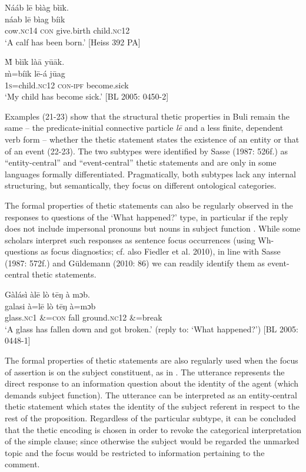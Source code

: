 \documentclass[output=paper]{langsci/langscibook}
\begin{document}
\ea\label{ex:schwarz:22}
\glll  Nááb    l\={e}  bìàg    bì\={i}k.\\
    \textup{náab}    l\={e}  bìag    {bíik}\\
       cow.\textsc{nc}14  \textsc{con}   give.birth  child.\textsc{nc}12\\
\glt ‘A calf has been born.’ [Heiss 392 PA]
\z

\ea\label{ex:schwarz:23}
\glll   \`{M}  bì\={i}k      là\={a}    y\={u}\={a}k.\\
    \textup{\`{m}=bíik      l\={e}-á    j\={u}ag}\\
       1\textsc{s}=child.\textsc{nc}12    \textsc{con}-\textsc{ipf}  become.sick\\
\glt ‘My child has become sick.’ [BL  2005: 0450-2]
\z

Examples (21-23) show that the structural thetic properties in Buli remain the same – the predicate-initial connective particle \textit{l\={e}} and a less finite, dependent verb form – whether the thetic statement states the existence of an entity  or that of an event (22-23). The two subtypes were identified by Sasse (1987: 526f.) as “entity-central” and “event-central” thetic statements and are only in some languages formally differentiated. Pragmatically, both subtypes lack any internal structuring, but semantically, they focus on different ontological categories.

The formal properties of thetic statements can also be regularly observed in the responses to questions of the ‘What happened?’ type, in particular if the reply does not include impersonal pronouns but nouns in subject function . While some scholars interpret such responses as sentence focus occurrences (using Wh-questions as focus diagnostics; cf. also Fiedler et al. 2010), in line with Sasse (1987: 572f.) and Güldemann (2010: 86) we can readily identify them as event-central thetic statements. 

\ea\label{ex:schwarz:24}
\glll   Gàlásì    àl\={e}    lò  t\={e}ŋ    à   mɔb.\\
    \textup{galasi} \textup{à=l\={e}    lò  t\={e}ŋ    à=mɔb}\\
       glass.\textsc{nc}1  \&=\textsc{con}  fall  ground.\textsc{nc}12  \&=break\\
\glt ‘A glass has fallen down and got broken.’ (reply to: ‘What happened?’) [BL  2005: 0448-1]
\z

The formal properties of thetic statements are also regularly used when the focus of assertion is on the subject constituent, as in . The utterance represents the direct response to an information question about the identity of the agent (which demands subject function). The utterance can be interpreted as an entity-central thetic statement which states the identity of the subject referent in respect to the rest of the proposition. Regardless of the particular subtype, it can be concluded that the thetic encoding is chosen in order to revoke the categorical interpretation of the simple clause; since otherwise the subject would be regarded the unmarked topic and the focus would be restricted to information pertaining to the comment. 
\end{document}
